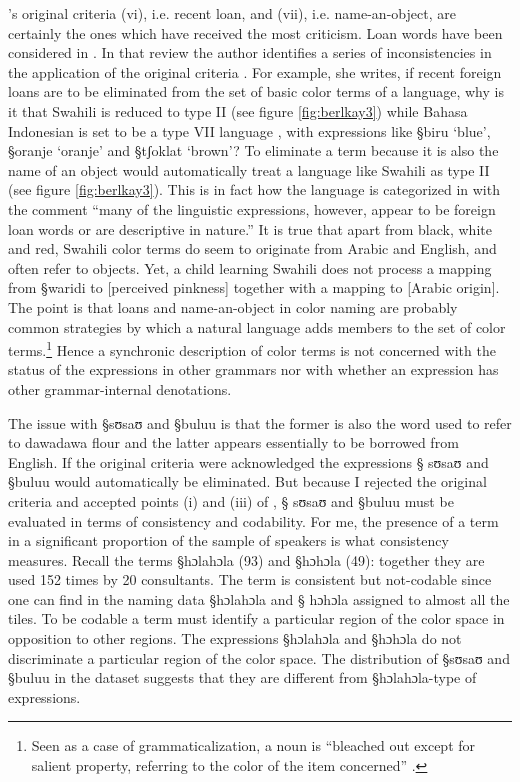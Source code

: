 \citeauthor{Berl69}'s  original criteria  (vi), i.e. recent loan,  and
(vii), i.e. name-an-object,
are certainly the ones which have received the most criticism. Loan words have
been  considered in \cite{Hick71}. In that review the author identifies a series
of inconsistencies  in the application of the original criteria
\citep[265]{Hick71}. For example, she writes, if recent foreign loans are to
be eliminated from the set of basic color terms of a language, why is it that
Swahili is reduced to type II  \cite[59]{Berl69} (see figure
\ref{fig:berlkay3}) while Bahasa Indonesian is set to be a type VII language
\cite[91]{Berl69}, with expressions like {\S biru} `blue', {\S oranje}
`oranje'
and {\S tʃoklat} `brown'? To eliminate a term because it is
also the name of
an  object would automatically treat a language like Swahili as  type II
(see figure \ref{fig:berlkay3}). This is in fact how the language is categorized
in \citet[59-60]{Berl69} with the comment  ``many of the linguistic
expressions, however, appear to be foreign loan words or are descriptive in
nature.'' It is true that apart from black, white and red, Swahili color terms
do seem to originate from Arabic and English, and often refer to objects. Yet, a
child
learning Swahili does not process a mapping from {\S waridi} to [{\sc perceived
pinkness}] together with a mapping to [{\sc Arabic origin}]. 
The
point is that loans and name-an-object in color naming are probably common
strategies by which a natural language adds members to the set of color
terms.\footnote{Seen as a case of grammaticalization, a noun is ``bleached out
except for salient property, referring to the color of the item concerned'' 
\cite[60]{Hein07}.} Hence a synchronic description of color terms is not
concerned with the status
of the expressions in other grammars nor with whether an expression has other 
grammar-internal denotations. 

The issue with {\S sʊsaʊ} and {\S buluu} is that the former is also the word used
to refer to dawadawa flour and the latter appears essentially to be  borrowed
from English. If the original criteria were acknowledged the expressions {\S
sʊsaʊ} and {\S buluu} would automatically be eliminated. But because I rejected
the original criteria and accepted points (i) and (iii) of \cite{Uusk08}, {\S
sʊsaʊ} and {\S buluu} must be evaluated in terms of consistency and codability.
For me, the presence of a term in a significant proportion  of the sample of
speakers  is
what consistency measures. Recall the terms {\S hɔlahɔla} (93) and {\S hɔhɔla}
(49): together they are used 152 times by 20 consultants. The term is consistent
but not-codable since one can find in the naming data  {\S hɔlahɔla} and  {\S
hɔhɔla}  assigned  to almost all the tiles.  To be codable a term must identify
a
particular region of the color space in opposition to other regions. The
expressions {\S hɔlahɔla} and  {\S hɔhɔla} do not discriminate a particular
region of the color space.   The distribution of {\S sʊsaʊ} and {\S buluu} in the
dataset suggests that they are  different from {\S hɔlahɔla}-type of
expressions. 

